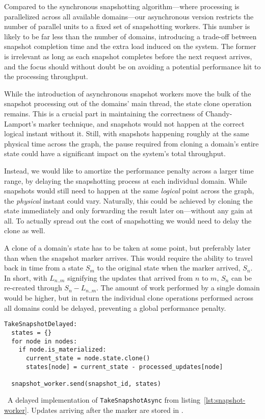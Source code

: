 Compared to the synchronous snapshotting algorithm---where processing is
parallelized across all available domains---our asynchronous version restricts
the number of parallel units to a fixed set of snapshotting workers. This number
is likely to be far less than the number of domains, introducing a trade-off
between snapshot completion time and the extra load induced on the system. The
former is irrelevant as long as each snapshot completes before the next request
arrives, and the focus should without doubt be on avoiding a potential
performance hit to the processing throughput.

While the introduction of asynchronous snapshot workers move the bulk of the
snapshot processing out of the domains' main thread, the state clone operation
remains. This is a crucial part in maintaining the correctness of
Chandy-Lamport's marker technique, and snapshots would not happen at the correct
logical instant without it. Still, with snapshots happening roughly at the same
physical time across the graph, the pause required from cloning a domain's
entire state could have a significant impact on the system's total throughput.


Instead, we would like to amortize the performance penalty across a larger time
range, by delaying the snapshotting process at each individual domain. While
snapshots would still need to happen at the same \textit{logical} point across
the graph, the \textit{physical} instant could vary. Naturally, this could be
achieved by cloning the state immediately and only forwarding the result later
on---without any gain at all. To actually spread out the cost of snapshotting we
would need to delay the clone as well.

A clone of a domain's state has to be taken at some point, but preferably later
than when the snapshot marker arrives. This would require the ability to travel
back in time from a state $ S_m $ to the original state when the marker arrived,
$ S_n $. In short, with $ L_{n..m} $ signifying the updates that arrived from $
n $ to $ m $, $ S_n $ can be re-created through $ S_n - L_{n..m} $.
The amount of work performed by a single domain would be higher, but in return
the individual clone operations performed across all domains could be delayed,
preventing a global performance penalty.

\begin{listing}[H]
  \begin{verbatim}
TakeSnapshotDelayed:
  states = {}
  for node in nodes:
    if node.is_materialized:
      current_state = node.state.clone()
      states[node] = current_state - processed_updates[node]

  snapshot_worker.send(snapshot_id, states)
  \end{verbatim}
  \caption{\
    A delayed implementation of \texttt{TakeSnapshotAsync} from
    listing~\ref{lst:snapshot-worker}. Updates arriving after the marker are
    stored in \code{processed\_updates}.
  }
\end{listing}

